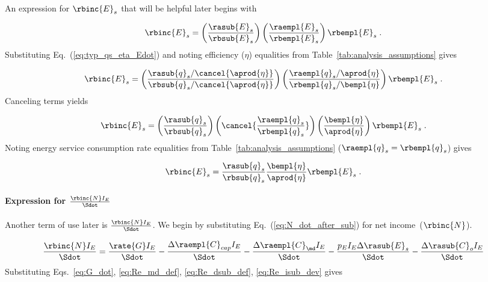 An expression for $\rbinc{E}_s$ that will be helpful later
begins with

\begin{equation}
  \rbinc{E}_s = \left( \frac{\rasub{E}_s}{\rbsub{E}_s} \right)
                \left( \frac{\raempl{E}_s}{\rbempl{E}_s} \right)
                \rbempl{E}_s \; .
\end{equation}
%
Substituting Eq.~(\ref{eq:typ_qs_eta_Edot}) and noting efficiency ($\eta$)
equalities from Table~\ref{tab:analysis_assumptions} gives

\begin{equation}
  \rbinc{E}_s = \left( \frac{\rasub{q}_s / \cancel{\aprod{\eta}}}{\rbsub{q}_s / \cancel{\aprod{\eta}}} \right)
                \left( \frac{\raempl{q}_s / \aprod{\eta}}{\rbempl{q}_s / \bempl{\eta}} \right)
                \rbempl{E}_s \; .
\end{equation}
%
Canceling terms yields

\begin{equation}
  \rbinc{E}_s = \left( \frac{\rasub{q}_s}{\rbsub{q}_s} \right)
                \left( \cancel{\frac{\raempl{q}_s}{\rbempl{q}_s}} \right)
                \left( \frac{\bempl{\eta}}{\aprod{\eta}}  \right)
                \rbempl{E}_s \; .
\end{equation}
%
Noting energy service consumption rate equalities from Table~\ref{tab:analysis_assumptions} 
($\raempl{q}_s = \rbempl{q}_s$) gives

\begin{equation} \label{eq:E_dot_s_hat}
  \rbinc{E}_s = \frac{\rasub{q}_s}{\rbsub{q}_s}
                \frac{\bempl{\eta}}{\aprod{\eta}}
                \rbempl{E}_s \; .
\end{equation}


\paragraph{Expression for $\frac{\rbinc{N} I_E}{\Sdot}$}
\label{sec:N_dot_hat_I_E_over_Sdot}

Another term of use later is $\frac{\rbinc{N} I_E}{\Sdot}$.
We begin by substituting Eq.~(\ref{eq:N_dot_after_sub}) for net income~($\rbinc{N}$).

\begin{equation}
  \frac{\rbinc{N} I_E}{\Sdot} = \frac{\rate{G} I_E}{\Sdot}
                                - \frac{\Delta \raempl{C}_{cap} I_E}{\Sdot}
                                - \frac{\Delta \raempl{C}_{\md} I_E}{\Sdot}
                                - \frac{p_E I_E \Delta \rasub{E}_s}{\Sdot}
                                - \frac{\Delta \rasub{C}_o I_E}{\Sdot}
\end{equation}
%
Substituting Eqs.~\ref{eq:G_dot}, \ref{eq:Re_md_def}, \ref{eq:Re_dsub_def}, \ref{eq:Re_isub_dev} gives

